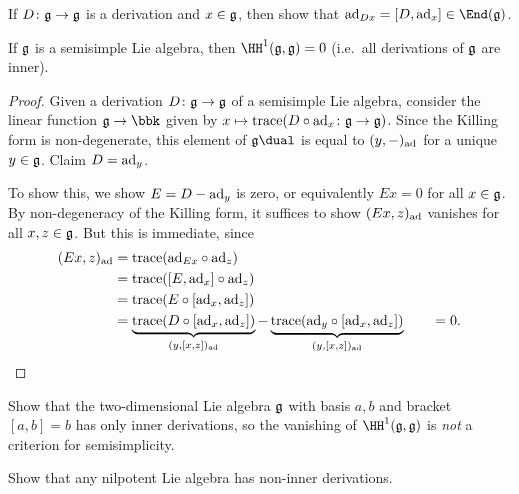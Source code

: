 \begin{exercise}
    If $D\colon \mathfrak{g}\to \mathfrak{g}$ is a derivation and $x\in \mathfrak{g}$, then show
    that $\adj_{Dx}=[D,\adj_x]\in \End(\frakg)$.
\end{exercise}

\begin{proposition}
    If $\mathfrak{g}$ is a semisimple Lie algebra, then $\HH^1(\frakg,\frakg)=0$
    (i.e.\ all derivations of $\mathfrak{g}$ are inner).

    \begin{proof}
        Given a derivation $D\colon \mathfrak{g}\to \mathfrak{g}$ of a semisimple Lie
        algebra, consider the linear function $\frakg\to \bbk$ given by
        $x\mapsto \text{trace}(D\circ \textnormal{ad}_x\colon \mathfrak{g}\to \mathfrak{g})$. Since the
        Killing form is non-degenerate, this element of $\frakg\dual$ is equal to
        $(y,-)_{\textnormal{ad}}$ for a unique $y\in \mathfrak{g}$. Claim $D=\textnormal{ad}_y$.

        To show this, we show $E=D-\textnormal{ad}_y$ is zero, or equivalently $Ex=0$ for
        all $x\in \mathfrak{g}$. By non-degeneracy of the Killing form, it suffices to
        show $(Ex,z)_{\textnormal{ad}}$ vanishes for
        all $x,z\in \mathfrak{g}$. But this is immediate, since
        \begin{align*}
            (Ex,z)_{\textnormal{ad}} 
            &= \textnormal{trace}(\textnormal{ad}_{Ex}\circ \textnormal{ad}_z) \\
            &=\textnormal{trace}([E,\textnormal{ad}_x]\circ \textnormal{ad}_z) \\
            &= \textnormal{trace}(E\circ [\textnormal{ad}_x, \textnormal{ad}_z]) \\ 
            &= \underbrace{\textnormal{trace}(D\circ [\textnormal{ad}_x,
            \textnormal{ad}_z])}_{(y,[x,z])_{\textnormal{ad}}} -
            \underbrace{\textnormal{trace}(\textnormal{ad}_y \circ
            [\textnormal{ad}_x,\textnormal{ad}_z])}_{(y,[x,z])_{\textnormal{ad}}} \qquad = 0. \qedhere
        \end{align*}
    \end{proof}
\end{proposition}

\begin{exercise}
    Show that the two-dimensional Lie algebra $\mathfrak{g}$ with basis $a,b$ and
    bracket $[a,b]=b$ has only inner derivations, so the vanishing of
    $\HH^1(\frakg,\frakg)$ is \emph{not} a criterion for semisimplicity.
\end{exercise}

\begin{exercise}
    Show that any nilpotent Lie algebra has non-inner derivations.
\end{exercise}

